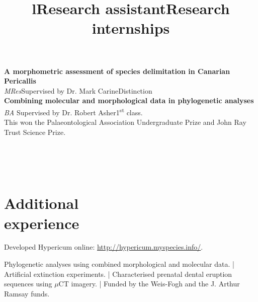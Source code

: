 \documentclass[margin]{res}
\begin{document}
\begin{resume}
	\textbf{A morphometric assessment of species delimitation in Canarian Pericallis}\\
	{\sl MRes}\hfill Supervised by Dr. Mark Carine\hfill Distinction\\
	
	\textbf{Combining molecular and morphological data in phylogenetic analyses}\\
	{\sl BA} \hfill Supervised by Dr. Robert Asher\hfill 1\textsuperscript{st} class.\\
	This won the Palaeontological Association Undergraduate Prize and John Ray Trust Science Prize.\\


	\begin{format}
		\title{l}\\
		\\
		\body\\
	\end{format}

	\section{Additional\\experience}
	\title{\textbf{Research assistant}}
	\begin{position}
		Developed Hypericum online: \url{http://hypericum.myspecies.info/}.
	\end{position}

	\title{\textbf{Research internships}}
	\begin{position}
		Phylogenetic analyses using combined morphological and molecular data.
		|
		Artificial extinction experiments.
		|
		Characterised prenatal dental eruption sequences using $\mu$CT imagery.
		|
		Funded by the Weis-Fogh and the J. Arthur Ramsay funds.
	\end{position}

\end{resume}
\end{document}
